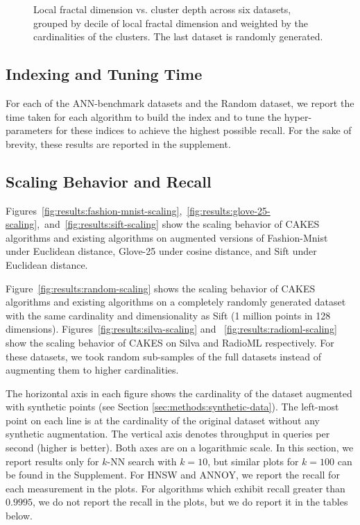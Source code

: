 \begin{figure}
\begin{subfigure}[b]{0.47\textwidth}
        \label{fig:results:random-lfd}
    \end{subfigure}
    \vspace{1em}
    \caption{Local fractal dimension vs. cluster depth across six datasets, grouped by decile of local fractal dimension and weighted by the cardinalities of the clusters.
    The last dataset is randomly generated.}
    \label{fig:results:lfd-plots}
\end{figure}


\subsection{Indexing and Tuning Time}
\label{sec:results:indexing-and-tuning-time}

For each of the ANN-benchmark datasets and the Random dataset, we report the time taken for each algorithm to build the index and to tune the hyper-parameters for these indices to achieve the highest possible recall. For the sake of brevity, these results are reported in the supplement.







\subsection{Scaling Behavior and Recall}
\label{sec:results:scaling-behavior-and-recall}

Figures~\ref{fig:results:fashion-mnist-scaling},~\ref{fig:results:glove-25-scaling},~and~\ref{fig:results:sift-scaling} show the scaling behavior of CAKES algorithms and existing algorithms on augmented versions of Fashion-Mnist under Euclidean distance,
Glove-25 under cosine distance, and
Sift under Euclidean distance.

Figure~\ref{fig:results:random-scaling} shows the scaling behavior of CAKES algorithms and existing algorithms on a completely randomly generated dataset with the same cardinality and dimensionality as Sift (1 million points in 128 dimensions).
Figures~\ref{fig:results:silva-scaling} and ~\ref{fig:results:radioml-scaling} show the scaling behavior of CAKES on Silva and RadioML respectively.
For these datasets, we took random sub-samples of the full datasets instead of augmenting them to higher cardinalities.

The horizontal axis in each figure shows the cardinality of the dataset augmented with synthetic points (see Section \ref{sec:methods:synthetic-data}).
The left-most point on each line is at the cardinality of the original dataset without any synthetic augmentation.
The vertical axis denotes throughput in queries per second (higher is better).
Both axes are on a logarithmic scale.
In this section, we report results only for $k$-NN search with $k = 10$, but similar plots for $k = 100$ can be found in the Supplement.
For HNSW and ANNOY, we report the recall for each measurement in the plots. For algorithms which exhibit recall greater than $0.9995$, we do not report the recall in the plots, but we do report it in the tables below.

